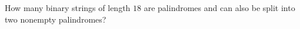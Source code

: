 How many binary strings of length $18$ are palindromes and can also be split into two nonempty palindromes?
